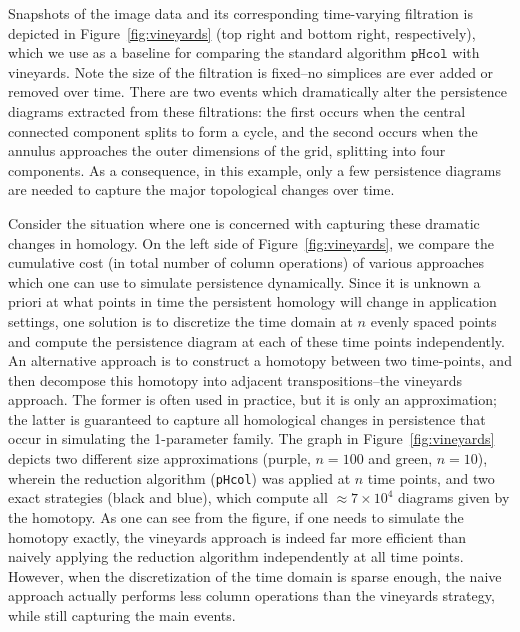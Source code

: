 \documentclass{siamart190516}
\begin{document}
Snapshots of the image data and its corresponding time-varying filtration is depicted in Figure~\ref{fig:vineyards} (top right and bottom right, respectively), which we use as a baseline for comparing the standard algorithm $\texttt{pHcol}$ with vineyards. Note the size of the filtration is fixed--no simplices are ever added or removed over time. 
There are two events which dramatically alter the persistence diagrams extracted from these filtrations: the first occurs when the central connected component splits to form a cycle, and the second occurs when the annulus approaches the outer dimensions of the grid, splitting into four components. As a consequence, in this example, only a few persistence diagrams are needed to capture the major topological changes over time. 
  
  Consider the situation where one is concerned with capturing these dramatic changes in homology.
  On the left side of Figure~\ref{fig:vineyards}, we compare the cumulative cost (in total number of column operations) of various approaches which one can use to simulate persistence dynamically. 
  Since it is unknown a priori at what points in time the persistent homology will change in application settings, one solution is to discretize the time domain at $n$ evenly spaced points and compute the persistence diagram at each of these time points independently. An alternative approach is to construct a homotopy between two time-points, and then decompose this homotopy into adjacent transpositions--the vineyards approach. The former is often used in practice, but it is only an approximation; the latter is guaranteed to capture all homological changes in persistence that occur in simulating the 1-parameter family. The graph in Figure~\ref{fig:vineyards} depicts two different size approximations (purple, $n=100$ and green, $n=10$), wherein the reduction algorithm (\texttt{pHcol}) was applied at $n$ time points, and two exact strategies (black and blue), which compute all $\approx 7 \times 10^{4}$ diagrams given by the homotopy. As one can see from the figure, if one needs to simulate the homotopy exactly, the vineyards approach is indeed far more efficient than naively applying the reduction algorithm independently at all time points.
  However, when the discretization of the time domain is sparse enough, the naive approach actually performs less column operations than the vineyards strategy, while still capturing the main events. 
  
\end{document}
